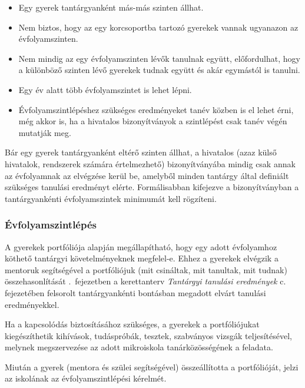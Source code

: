 \begin{itemize}
      \item Egy gyerek tantárgyanként más-más szinten állhat.
      \item Nem biztos, hogy az egy korcsoportba tartozó gyerekek vannak ugyanazon az évfolyamszinten.

      \item Nem mindig az egy évfolyamszinten lévők tanulnak együtt, előfordulhat, hogy a különböző szinten lévő gyerekek tudnak együtt és akár egymástól is tanulni.

      \item Egy év alatt több évfolyamszintet is lehet lépni.
      \item Évfolyamszintlépéshez szükséges eredményeket tanév közben is el lehet érni, még akkor is, ha a hivatalos bizonyítványok a szintlépést csak tanév végén mutatják meg.
\end{itemize}

Bár egy gyerek tantárgyanként eltérő szinten állhat, a hivatalos (azaz külső hivatalok, rendszerek számára értelmezhető) bizonyítványába mindig csak annak az évfolyamnak az elvégzése kerül be, amelyből minden tantárgy által definiált szükséges tanulási eredményt elérte. Formálisabban kifejezve a bizonyítványban a tantárgyankénti évfolyamszintek minimumát kell rögzíteni.

\subsubsection{Évfolyamszintlépés}
\label{sec:evfolyamszintlepes}
A gyerekek portfóliója alapján megállapítható, hogy egy adott évfolyamhoz köthető tantárgyi követelményeknek megfelel-e. Ehhez a gyerekek elvégzik a mentoruk segítségével a portfóliójuk (mit csináltak, mit tanultak, mit tudnak) összehasonlítását \ifkerettanterv
      .~fejezetben
\else
      a kerettanterv \emph{Tantárgyi tanulási eredmények} c. fejezetében
\fi felsorolt tantárgyankénti bontásban megadott elvárt tanulási eredményekkel.

Ha a kapcsolódás biztosításához szükséges, a gyerekek a portfóliójukat kiegészíthetik kihívások, tudáspróbák, tesztek, szabványos vizsgák teljesítésével, melynek megszervezése az adott mikroiskola tanárközösségének a feladata.

Miután a gyerek (mentora és szülei segítségével) összeállította a portfólió\-ját, jelzi az iskolának az évfolyamszintlépési kérelmét.

